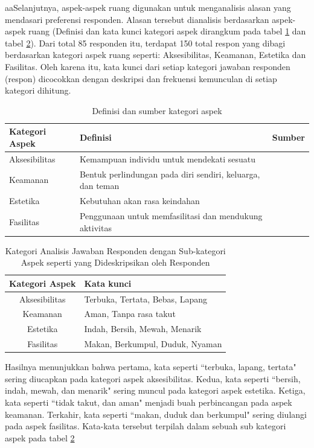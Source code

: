 \documentclass[11pt]{udthesis} %
\begin{document}
aaSelanjutnya, aspek-aspek ruang digunakan untuk menganalisis alasan yang mendasari preferensi responden.
Alasan tersebut dianalisis berdasarkan aspek-aspek ruang (Definisi dan kata kunci kategori aspek dirangkum pada tabel \ref{tab:defasp} dan tabel \ref{tab:katasp}). Dari total 85 responden itu, terdapat 150 total respon yang dibagi berdasarkan kategori aspek ruang seperti: Aksesibilitas, Keamanan, Estetika dan Fasilitas. Oleh karena itu, kata kunci dari setiap kategori jawaban responden (respon) dicocokkan dengan deskripsi dan frekuensi kemunculan di setiap kategori dihitung.

\begin{table}[htpb]
    \centering
    \caption{Definisi dan sumber kategori aspek}
    \label{tab:defasp}
    \begin{tabular}{p{2.2cm} p{} l}
        \toprule
        \textbf{Kategori Aspek} & \textbf{Definisi} & \textbf{Sumber}\\
\midrule
Aksesibilitas & Kemampuan individu untuk mendekati sesuatu  & \cite{larosa2018} \\
Keamanan & Bentuk perlindungan pada diri sendiri, keluarga, dan teman & \cite{carr1992} \\
Estetika & Kebutuhan akan rasa keindahan & \cite{hradilova2013} \\
Fasilitas & Penggunaan untuk memfasilitasi dan mendukung aktivitas  & \cite{carmona2021} \\
\bottomrule
    \end{tabular}
\end{table}

\begin{table}[ht]
    \centering
    \caption{Kategori Analisis Jawaban Responden dengan Sub-kategori Aspek seperti yang Dideskripsikan oleh Responden}
    \label{tab:katasp}
    \begin{tabular}{c l}
        \toprule
        \textbf{Kategori Aspek} & \textbf{Kata kunci}\\
\midrule
Aksesibilitas & Terbuka, Tertata, Bebas, Lapang \\
Keamanan & Aman, Tanpa rasa takut\\
Estetika & Indah, Bersih, Mewah, Menarik \\
Fasilitas & Makan, Berkumpul, Duduk, Nyaman \\
\bottomrule
    \end{tabular}
\end{table}

Hasilnya menunjukkan bahwa pertama, kata seperti ``terbuka, lapang, tertata" sering diucapkan pada kategori aspek aksesibilitas. Kedua, kata seperti ``bersih, indah, mewah, dan menarik" sering muncul pada kategori aspek estetika. Ketiga, kata seperti ``tidak takut, dan aman" menjadi buah perbincangan pada aspek keamanan. Terkahir, kata seperti ``makan, duduk dan berkumpul" sering diulangi pada aspek fasilitas. Kata-kata tersebut terpilah dalam sebuah sub kategori aspek pada tabel \ref{tab:katasp}
\end{document}
